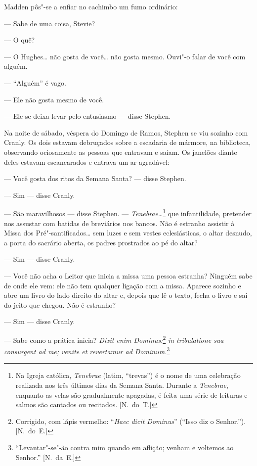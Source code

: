 Madden pôs"-se a enfiar no cachimbo um fumo ordinário:

--- Sabe de uma coisa, Stevie?

--- O quê?

--- O Hughes\ldots{} não gosta de você\ldots{} não gosta mesmo.  Ouvi"-o falar de você com
alguém.

--- “Alguém” é vago.

--- Ele não gosta mesmo de você.

--- Ele se deixa levar pelo entusiasmo --- disse Stephen.

Na noite de sábado, véspera do Domingo de Ramos, Stephen se viu sozinho com
Cranly.  Os dois estavam debruçados sobre a escadaria de mármore, na
biblioteca, observando ociosamente as pessoas que entravam e saíam.  Os
janelões diante deles estavam escancarados e entrava um ar
agradável:

--- Você gosta dos ritos da Semana Santa? --- disse Stephen.

--- Sim --- disse Cranly.

--- São maravilhosos --- disse Stephen.  --- \textit{Tenebrae}\ldots{}\footnote[\setcounter{symbol}{1}]{ Na
Igreja católica, \textit{Tenebrae} (latim, “trevas”) é o nome de uma celebração
realizada nos três últimos dias da Semana Santa.  Durante a \textit{Tenebrae},
enquanto as velas são gradualmente apagadas, é feita uma série de leituras e
salmos são cantados ou recitados. [N.~do~T.]} que infantilidade, pretender
nos assustar com batidas de breviários nos bancos.  Não é estranho assistir à
Missa dos Pré"-santificados\ldots{} sem luzes e sem vestes eclesiásticas, o altar
desnudo, a porta do sacrário aberta, os padres prostrados ao pé do altar?

--- Sim --- disse Cranly.

--- Você não acha o Leitor que inicia a missa uma pessoa estranha?  Ninguém
sabe de onde ele vem: ele não tem qualquer ligação com a missa.  Aparece
sozinho e abre um livro do lado direito do altar e, depois que lê o texto,
fecha o livro e sai do jeito que chegou.  Não é estranho?

--- Sim --- disse Cranly.

--- Sabe como a prática inicia?  \textit{Dixit enim Dominus:}\footnote[\setcounter{symbol}{2}]{ Corrigido, 
com lápis vermelho: “\textit{Haec dicit Dominus}” (``Isso diz o Senhor.''). [N.~do~E.]} \textit{in tribulatione 
sua consurgent ad me; venite et revertamur ad Dominum.}\footnote{ ``Levantar"-se"-ão contra mim quando em aflição; 
venham e voltemos ao Senhor.'' [N.~da~E.]}

